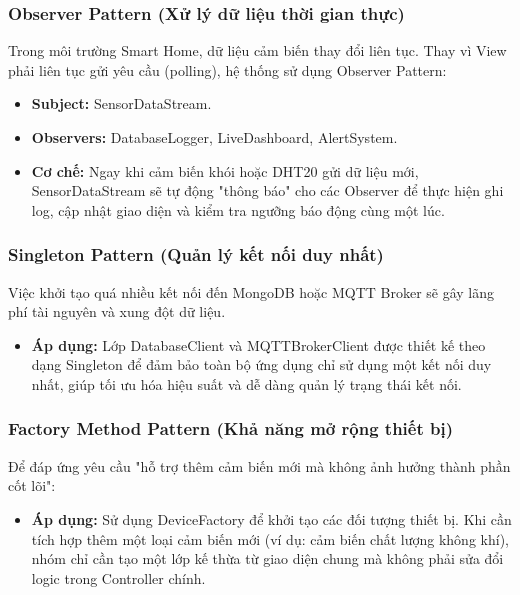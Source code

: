 \documentclass[a4paper,twoside]{article}
\begin{document}
\subsubsection{Observer Pattern (Xử lý dữ liệu thời gian thực)}
Trong môi trường Smart Home, dữ liệu cảm biến thay đổi liên tục. Thay vì View phải liên tục gửi yêu cầu (polling), hệ thống sử dụng Observer Pattern:

\begin{itemize}
    \item \textbf{Subject:} SensorDataStream.
    \item \textbf{Observers:} DatabaseLogger, LiveDashboard, AlertSystem.
    \item \textbf{Cơ chế:} Ngay khi cảm biến khói hoặc DHT20 gửi dữ liệu mới, SensorDataStream sẽ tự động "thông báo" cho các Observer để thực hiện ghi log, cập nhật giao diện và kiểm tra ngưỡng báo động cùng một lúc.
\end{itemize}

\subsubsection{Singleton Pattern (Quản lý kết nối duy nhất)}
Việc khởi tạo quá nhiều kết nối đến MongoDB hoặc MQTT Broker sẽ gây lãng phí tài nguyên và xung đột dữ liệu.

\begin{itemize}
    \item \textbf{Áp dụng:} Lớp DatabaseClient và MQTTBrokerClient được thiết kế theo dạng Singleton để đảm bảo toàn bộ ứng dụng chỉ sử dụng một kết nối duy nhất, giúp tối ưu hóa hiệu suất và dễ dàng quản lý trạng thái kết nối.
\end{itemize}

\subsubsection{Factory Method Pattern (Khả năng mở rộng thiết bị)}
Để đáp ứng yêu cầu "hỗ trợ thêm cảm biến mới mà không ảnh hưởng thành phần cốt lõi":

\begin{itemize}
    \item \textbf{Áp dụng:} Sử dụng DeviceFactory để khởi tạo các đối tượng thiết bị. Khi cần tích hợp thêm một loại cảm biến mới (ví dụ: cảm biến chất lượng không khí), nhóm chỉ cần tạo một lớp kế thừa từ giao diện chung mà không phải sửa đổi logic trong Controller chính.
\end{itemize}
\end{document}
